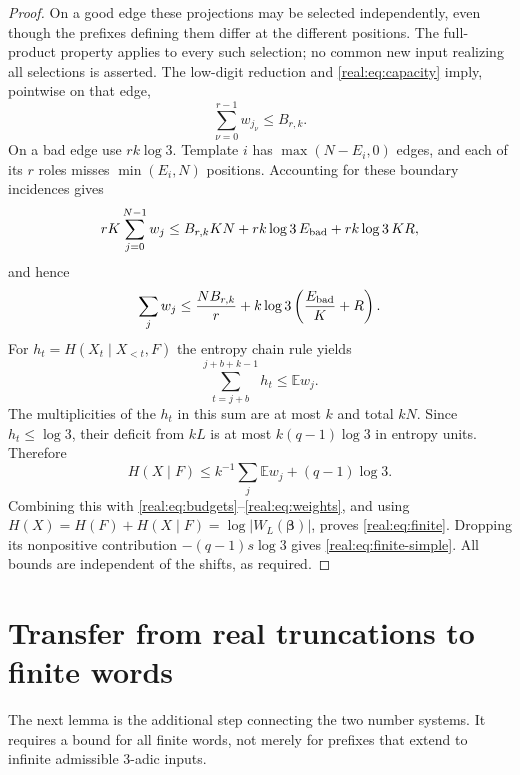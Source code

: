 \documentclass[11pt]{article}
\theoremstyle{definition}
\theoremstyle{remark}
\begin{document}
\begin{proof}
On a good edge these projections may be selected independently, even
though the prefixes defining them differ at the different positions.
The full-product property applies to every such selection; no common
new input realizing all selections is asserted. The low-digit reduction
and \eqref{real:eq:capacity} imply, pointwise on that edge,
\[
                     \sum_{\nu=0}^{r-1}w_{j_\nu}\le B_{r,k}.
\]
On a bad edge use $rk\log3$. Template $i$ has
$\max(N-E_i,0)$ edges, and each of its $r$ roles misses
$\min(E_i,N)$ positions. Accounting for these boundary incidences gives
\[
 rK\sum_{j=0}^{N-1}w_j
 \le B_{r,k}KN+rk\log3\,E_{\rm bad}+rk\log3\,KR,
\]
and hence
\begin{equation}\label{real:eq:weights}
 \sum_jw_j\le \frac{NB_{r,k}}r+
                       k\log3\left(\frac{E_{\rm bad}}K+R\right).
\end{equation}
For $h_t=H(X_t\mid X_{<t},F)$ the entropy chain rule yields
\[
 \sum_{t=j+b}^{j+b+k-1}h_t\le\mathbb E w_j.
\]
The multiplicities of the $h_t$ in this sum are at most $k$ and total
$kN$. Since $h_t\le\log3$, their deficit from $kL$ is at most
$k(q-1)\log3$ in entropy units. Therefore
\[
 H(X\mid F)\le k^{-1}\sum_j\mathbb E w_j+(q-1)\log3.
\]
Combining this with \eqref{real:eq:budgets}--\eqref{real:eq:weights}, and using
$H(X)=H(F)+H(X\mid F)=\log|W_L(\boldsymbol\beta)|$, proves
\eqref{real:eq:finite}. Dropping its nonpositive contribution
$-(q-1)s\log3$ gives \eqref{real:eq:finite-simple}. All bounds are independent
of the shifts, as required.
\end{proof}

\section{Transfer from real truncations to finite words}
The next lemma is the additional step connecting the two number systems.
It requires a bound for all finite words, not merely for prefixes that
extend to infinite admissible 3-adic inputs.
\end{document}
